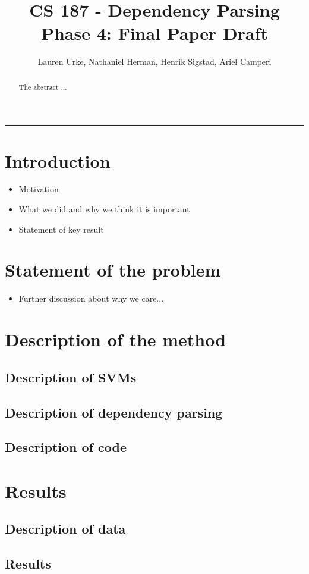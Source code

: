 \documentclass[12pt,fleqn]{article}
\title{CS 187 - Dependency Parsing\\Phase 4: Final Paper Draft}
\author{Lauren Urke, Nathaniel Herman, Henrik Sigstad, Ariel Camperi}
\date{}
\begin{document}
    \maketitle
    \hrule
\begin{abstract}
The abstract ...
\end{abstract}
\section{Introduction}
\begin{itemize}
\item Motivation
\item What we did and why we think it is important
\item Statement of key result
\end{itemize}

\section{Statement of the problem}
\begin{itemize}
\item Further discussion about why we care...
\end{itemize}

\section{Description of the method}

\subsection{Description of SVMs}
\subsection{Description of dependency parsing}
\subsection{Description of code}

\section{Results}
\subsection{Description of data}
\subsection{Results}
\end{document}
